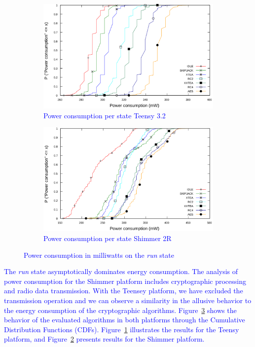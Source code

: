 \documentclass[journal]{IEEEtran}
\newcommand{\rever}{\textcolor{blue}}
\begin{document}
\begin{figure}[!t]
 \vspace{-0.5cm}
\centering
 \begin{subfigure}[b]{0.35\textwidth}
  \includegraphics[width=\textwidth]{Figures/cdf_Teensy.png}
  \caption{\rever{Power consumption per state Teensy 3.2}}
  \label{fig:cdf_Teensy}
 \end{subfigure}
 \hspace{10mm}
 \begin{subfigure}[b]{0.35\textwidth}
  \includegraphics[width=\textwidth]{Figures/cdf_zig.png}
  \caption{\rever{Power consumption per state Shimmer 2R}}
  \label{fig:cdf_zig}
 \end{subfigure}
 \vspace{-0.2cm}
 \caption{\rever{Power consumption in milliwatts on the {\em run} state}}
 \label{fig:cdf}
 \vspace{-0.45cm}
\end{figure}

\rever{The {\em run} state asymptotically dominates energy consumption. The analysis of power consumption for the Shimmer platform includes cryptographic processing and radio data transmission. With the Teensey platform, we have excluded the transmission operation and we can observe a similarity in the allusive behavior to the energy consumption of the cryptographic algorithms. Figure~\ref{fig:cdf} shows the behavior of the evaluated algorithms in both platforms through the Cumulative Distribution Functions (CDFs). Figure~\ref{fig:cdf_Teensy} illustrates the results for the Teensy platform, and Figure~\ref{fig:cdf_zig} presents results for the Shimmer platform.}
\end{document}
